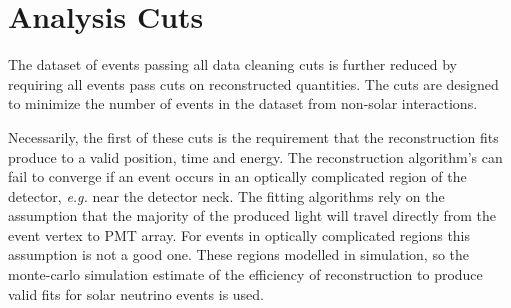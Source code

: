 
\section{Analysis Cuts}
The dataset of events passing all data cleaning cuts is further reduced by
requiring all events pass cuts on reconstructed quantities.
The cuts are designed to minimize the number of events in the dataset from
non-solar interactions.

Necessarily, the first of these cuts is the requirement that the reconstruction
fits produce to a valid position, time and energy.
The reconstruction algorithm's can fail to converge if an event occurs in an
optically complicated region of the detector, \textit{e.g.} near the detector
neck. The fitting algorithms rely on the assumption that the majority of
the produced light will travel directly from the event vertex to PMT array.
For events in optically complicated regions this assumption is not a good one.
These regions modelled in simulation, so the monte-carlo simulation estimate of
the efficiency of reconstruction to produce valid fits for solar neutrino events
is used.

